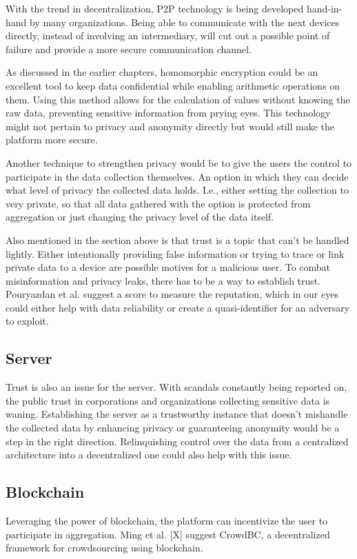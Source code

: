 With the trend in decentralization, P2P technology is being developed hand-in-hand by many organizations. Being able to communicate with the next devices directly, instead of involving an intermediary, will cut out a possible point of failure and provide a more secure communication channel.

As discussed in the earlier chapters, homomorphic encryption could be an excellent tool to keep data confidential while enabling arithmetic operations on them. Using this method allows for the calculation of values without knowing the raw data, preventing sensitive information from prying eyes. This technology might not pertain to privacy and anonymity directly but would still make the platform more secure.

Another technique to strengthen privacy would be to give the users the control to participate in the data collection themselves. An option in which they can decide what level of privacy the collected data holds. I.e., either setting the collection to very private, so that all data gathered with the option is protected from aggregation or just changing the privacy level of the data itself.

Also mentioned in the section above is that trust is a topic that can't be handled lightly. Either intentionally providing false information or trying to trace or link private data to a device are possible motives for a malicious user. To combat misinformation and privacy leaks, there has to be a way to establish trust. Pouryazdan et al. suggest a score to measure the reputation, which in our eyes could either help with data reliability or create a quasi-identifier for an adversary to exploit.

\subsection{Server}
Trust is also an issue for the server. With scandals constantly being reported on, the public trust in corporations and organizations collecting sensitive data is waning. Establishing the server as a trustworthy instance that doesn't mishandle the collected data by enhancing privacy or guaranteeing anonymity would be a step in the right direction. Relinquishing control over the data from a centralized architecture into a decentralized one could also help with this issue.

\subsection{Blockchain}
Leveraging the power of blockchain, the platform can incentivize the user to participate in aggregation. Ming et al. [X] suggest CrowdBC, a decentralized framework for crowdsourcing using blockchain. 

